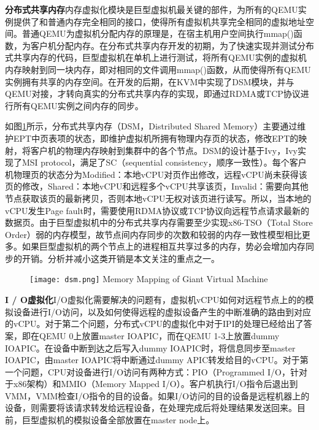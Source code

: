 \noindent\textbf{分布式共享内存}\quad 内存虚拟化模块是巨型虚拟机最关键的部件，为所有的QEMU实例提供了和普通内存完全相同的接口，使得所有虚拟机共享完全相同的虚拟地址空间。普通QEMU为虚拟机分配内存的原理是，在宿主机用户空间执行mmap()函数，为客户机分配内存。在分布式共享内存开发的初期，为了快速实现并测试分布式共享内存的代码，巨型虚拟机在单机上进行测试，将所有QEMU实例的虚拟机内存映射到同一块内存，即对相同的文件调用mmap()函数，从而使得所有QEMU实例拥有共享的内存空间。在开发的后期，在KVM中实现了DSM模块，并与QEMU对接，才转向真实的分布式共享内存的实现，即通过RDMA或TCP协议进行所有QEMU实例之间内存的同步。

如图\ref{fig:DSM}所示，分布式共享内存（DSM，Distributed Shared Memory）主要通过维护EPT中页表项的状态，即维护虚拟机所拥有物理内存页的状态，修改EPT的映射，将客户机的物理内存映射到集群中的各个节点。DSM的设计基于Ivy\cite{ivy}，Ivy实现了MSI protocol，满足了SC（sequential consistency，顺序一致性）。每个客户机物理页的状态分为Modified：本地vCPU对页作出修改，远程vCPU尚未获得该页的修改，Shared：本地vCPU和远程多个vCPU共享该页，Invalid：需要向其他节点获取该页的最新拷贝，否则本地vCPU无权对该页进行读写。所以，当本地的vCPU发生Page fault时，需要使用RDMA协议或TCP协议向远程节点请求最新的数据页。由于巨型虚拟机中的分布式共享内存需要至少实现x86-TSO（Total Store Order）\cite{tso}弱的内存模型，故节点间内存同步的次数和较弱的内存一致性模型相比更多。如果巨型虚拟机的两个节点上的进程相互共享过多的内存，势必会增加内存同步的开销。分析并减小这类开销是本文关注的重点之一。
\label{chap:DSM}
\begin{figure}[!htp]
  \centering
  \texttt{[image: dsm.png]}
    {Memory Mapping of Giant Virtual Machine}
  \label{fig:DSM}
\end{figure}

\noindent\textbf{I / O虚拟化}\quad I/O虚拟化需要解决的问题有，虚拟机vCPU如何对远程节点上的的模拟设备进行I/O访问，以及如何使得远程的虚拟设备产生的中断准确的路由到对应的vCPU。对于第二个问题，分布式vCPU的虚拟化中对于IPI的处理已经给出了答案，即在QEMU 0上放置master IOAPIC，而在QEMU 1-3上放置dummy IOAPIC。在设备中断到达之后写入dummy IOAPIC时，将信息同步至master IOAPIC，由master IOAPIC将中断通过dummy APIC转发给目的vCPU。对于第一个问题，CPU对设备进行I/O访问有两种方式：PIO（Programmed I/O，针对于x86架构）和MMIO（Memory Mapped I/O）。客户机执行I/O指令后退出到VMM，VMM检查I/O指令的目的设备。如果I/O访问的目的设备是远程机器上的设备，则需要将该请求转发给远程设备，在处理完成后将处理结果发送回来。目前，巨型虚拟机的模拟设备全部放置在master node上。

